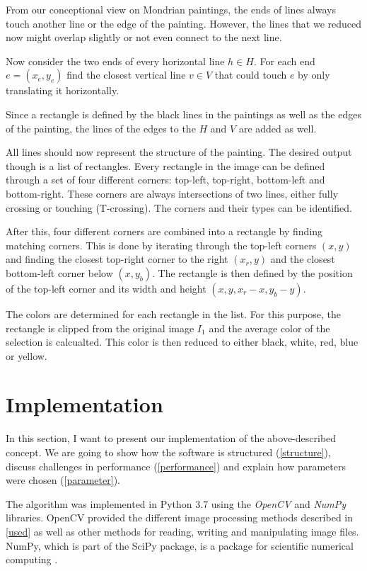 \documentclass[serif,article,noparskip]{agse-thesis}
\begin{document}
From our conceptional view on Mondrian paintings, the ends of lines always touch
another line or the edge of the painting. However, the lines that we reduced now
might overlap slightly or not even connect to the next line.

Now consider the two ends of every horizontal line $h \in H$. For each end $e =
(x_e,y_e)$ find the closest vertical line $v \in V$ that could touch $e$ by
only translating it horizontally.

Since a rectangle is defined by the black lines in the paintings as well as the
edges of the painting, the lines of the edges to the $H$ and $V$ are added as
well.

All lines should now represent the structure of the painting. The desired output
though is a list of rectangles. Every rectangle in the image can be defined
through a set of four different corners: top-left, top-right, bottom-left and
bottom-right. These corners are always intersections of two lines, either fully
crossing or touching (T-crossing). The corners and their types can be
identified.

After this, four different corners are combined into a rectangle by finding
matching corners. This is done by iterating through the top-left corners $(x,y)$
and finding the closest top-right corner to the right $(x_r, y)$ and the
closest bottom-left corner below $(x, y_b)$. The rectangle is then defined by
the position of the top-left corner and its width and height
$(x,y,x_r-x,y_b-y)$.

The colors are determined for each rectangle in the list. For this purpose, the
rectangle is clipped from the original image $I_1$ and the average color of the
selection is calcualted. This color is then reduced to either black, white, red,
blue or yellow.

\section{Implementation} \label{implementation}

In this section, I want to present our implementation of the above-described
concept. We are going to show how the software is structured
(\ref{structure}), discuss challenges in performance (\ref{performance}) and
explain how parameters were chosen (\ref{parameter}).

The algorithm was implemented in Python 3.7 using the \textit{OpenCV} and
\textit{NumPy} libraries. OpenCV provided the different image processing methods
described in \ref{used} as well as other methods for reading, writing and
manipulating image files. NumPy, which is part of the SciPy package, is a
package for scientific numerical computing \cite{scipy}.
\end{document}
